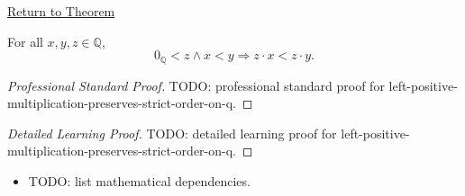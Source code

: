 \newpage
{}
\label{prf:left-positive-multiplication-preserves-strict-order-on-q}

\begin{remark*}[Return]
\hyperref[thm:left-positive-multiplication-preserves-strict-order-on-q]{Return to Theorem}
\end{remark*}

\begin{theorem*}
For all $x,y,z\in\mathbb{Q}$,
\[
0_{\mathbb{Q}}<z\land x<y
\Longrightarrow
z\cdot x<z\cdot y.
\]
\end{theorem*}

\begin{proof}[Professional Standard Proof]
\LRAProofBodyStart
TODO: professional standard proof for left-positive-multiplication-preserves-strict-order-on-q.
\end{proof}

\begin{proof}[Detailed Learning Proof]
\LRAProofBodyStart
TODO: detailed learning proof for left-positive-multiplication-preserves-strict-order-on-q.
\end{proof}

\begin{remark*}
\end{remark*}

\begin{dependencies}
\begin{itemize}
  \item TODO: list mathematical dependencies.
\end{itemize}
\end{dependencies}

\clearpage
